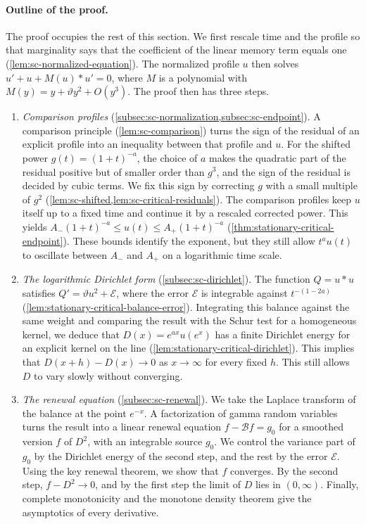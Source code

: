 \paragraph{Outline of the proof.} The proof occupies the rest of this section. We first rescale time and the profile so that marginality says that the coefficient of the linear memory term equals one (\cref{lem:sc-normalized-equation}). The normalized profile $u$ then solves $u'+u+M(u)*u'=0$, where $M$ is a polynomial with $M(y)=y+\vartheta y^2+O(y^3)$. The proof then has three steps.
\begin{enumerate}[label=\arabic*.]
\item \emph{Comparison profiles} (\cref{subsec:sc-normalization,subsec:sc-endpoint}). A comparison principle (\cref{lem:sc-comparison}) turns the sign of the residual of an explicit profile into an inequality between that profile and $u$. For the shifted power $g(t)=(1+t)^{-a}$, the choice of $a$ makes the quadratic part of the residual positive but of smaller order than $g^3$, and the sign of the residual is decided by cubic terms. We fix this sign by correcting $g$ with a small multiple of $g^2$ (\cref{lem:sc-shifted,lem:sc-critical-residuals}). The comparison profiles keep $u$ itself up to a fixed time and continue it by a rescaled corrected power. This yields $A_-(1+t)^{-a}\le u(t)\le A_+(1+t)^{-a}$ (\cref{thm:stationary-critical-endpoint}). These bounds identify the exponent, but they still allow $t^au(t)$ to oscillate between $A_-$ and $A_+$ on a logarithmic time scale.
\item \emph{The logarithmic Dirichlet form} (\cref{subsec:sc-dirichlet}). The function $Q=u*u$ satisfies $Q'=\vartheta u^2+\mathcal E$, where the error $\mathcal E$ is integrable against $t^{-(1-2a)}$ (\cref{lem:stationary-critical-balance-error}). Integrating this balance against the same weight and comparing the result with the Schur test for a homogeneous kernel, we deduce that $D(x)=e^{ax}u(e^x)$ has a finite Dirichlet energy for an explicit kernel on the line (\cref{lem:stationary-critical-dirichlet}). This implies that $D(x+h)-D(x)\to0$ as $x\to\infty$ for every fixed $h$. This still allows $D$ to vary slowly without converging.
\item \emph{The renewal equation} (\cref{subsec:sc-renewal}). We take the Laplace transform of the balance at the point $e^{-x}$. A factorization of gamma random variables turns the result into a linear renewal equation $f-\mathcal Bf=g_0$ for a smoothed version $f$ of $D^2$, with an integrable source $g_0$. We control the variance part of $g_0$ by the Dirichlet energy of the second step, and the rest by the error $\mathcal E$. Using the key renewal theorem, we show that $f$ converges. By the second step, $f-D^2\to0$, and by the first step the limit of $D$ lies in $(0,\infty)$. Finally, complete monotonicity and the monotone density theorem give the asymptotics of every derivative.
\end{enumerate}


